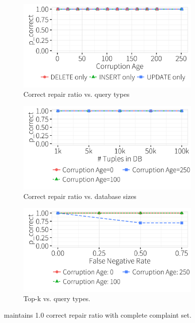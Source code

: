    \begin{figure}[t]
  \centering
  \begin{subfigure} [t]{.3\textwidth}
    \includegraphics[width = .99\columnwidth]{figures/indelup_acc_idx}
    \vspace*{-.25in}
    \caption{Correct repair ratio vs. query types}
    \label{f:querytyperatio} 
    \end{subfigure}
    \begin{subfigure} [t]{.3\textwidth}
    \includegraphics[width = .99\columnwidth]{figures/dbsize_acc_idx}
    \vspace*{-.25in}
    \caption{Correct repair ratio vs. database sizes}
    \label{f:dbsizeratio} 
    \end{subfigure}
    \begin{subfigure} [t]{.3\textwidth}
    \includegraphics[width = .99\columnwidth]{figures/noise_fn_acc_idx}
    \vspace*{-.25in}
    \caption{Top-k vs. query types. }
    \vspace*{-.1in}
    \label{f:noiseratio} 
    \end{subfigure}
   \caption{ \sys maintains 1.0 correct repair ratio with complete complaint set. }
   \vspace*{-.1in}
   \label{fig:truerate}
  \end{figure}

